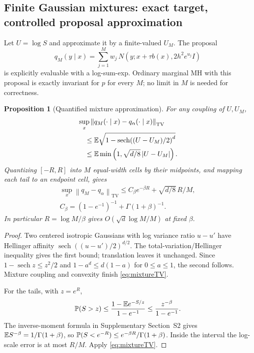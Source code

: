 \documentclass[pdflatex,iicol,sn-mathphys-ay]{sn-jnl}
\newtheorem{proposition}[theorem]{Proposition}
\theoremstyle{definition}\newtheorem{definition}[theorem]{Definition}
\theoremstyle{remark}\newtheorem{remark}[theorem]{Remark}
\numberwithin{equation}{section}
\newcommand{\norm}[1]{\left\lVert#1\right\rVert}\newcommand{\TV}{\mathrm{TV}}
\newcommand{\sech}{\operatorname{sech}}\newcommand{\Var}{\operatorname{Var}}
\newcommand{\1}{\mathbf 1}
\begin{document}
\subsection{Finite Gaussian mixtures: exact target, controlled proposal approximation}
Let $U=\log S$ and approximate it by a finite-valued $U_M$. The proposal
\begin{equation}
q_M(y\mid x)=\sum_{j=1}^M w_j\,
N(y;x+\tau b(x),2h^2e^{u_j}I)\label{eq:finiteproposal}
\end{equation}
is explicitly evaluable with a log-sum-exp. Ordinary marginal MH with this proposal is exactly invariant for $p$ for every $M$; no limit in $M$ is needed for correctness.

\begin{proposition}[Quantified mixture approximation]\label{prop:finite}
For any coupling of $U,U_M$,
\begin{equation}
\begin{aligned}
&\sup_x\norm{q_M(\cdot\mid x)-q_\alpha(\cdot\mid x)}_{\TV}\\
&\quad\le\E\sqrt{1-\sech\!\left((U-U_M)/2\right)^d}\\
&\quad\le\E\min\left(1,\sqrt{d/8}\,|U-U_M|\right).
\end{aligned}\label{eq:mixtureTV}
\end{equation}
Quantizing $[-R,R]$ into $M$ equal-width cells by their midpoints, and mapping each tail to an endpoint cell, gives
\begin{equation}
\begin{gathered}
\sup_x\norm{q_M-q_\alpha}_{\TV}
\le C_\beta e^{-\beta R}+\sqrt{d/8}\,R/M,\\
 C_\beta=(1-e^{-1})^{-1}+\Gamma(1+\beta)^{-1}.
\end{gathered}\label{eq:quantizeTV}
\end{equation}
In particular $R=\log M/\beta$ gives $O(\sqrt d\log M/M)$ at fixed $\beta$.
\end{proposition}
\begin{proof}
Two centered isotropic Gaussians with log variance ratio $u-u'$ have Hellinger affinity $\sech((u-u')/2)^{d/2}$. The total-variation/Hellinger inequality gives the first bound; translation leaves it unchanged. Since $1-\sech z\le z^2/2$ and $1-a^d\le d(1-a)$ for $0\le a\le1$, the second follows. Mixture coupling and convexity finish \eqref{eq:mixtureTV}.

For the tails, with $z=e^R$,
\[
\mathbb P(S>z)\le\frac{1-\mathbb E e^{-S/z}}{1-e^{-1}}
\le\frac{z^{-\beta}}{1-e^{-1}}.
\]
The inverse-moment formula in Supplementary Section~S2 gives $\mathbb E S^{-\beta}=1/\Gamma(1+\beta)$, so $\mathbb P(S<e^{-R})\le e^{-\beta R}/\Gamma(1+\beta)$. Inside the interval the log-scale error is at most $R/M$. Apply \eqref{eq:mixtureTV}.
\end{proof}
\end{document}
